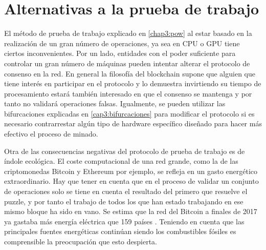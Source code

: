 \section{Alternativas a la prueba de trabajo}
El método de prueba de trabajo explicado en \ref{chap3:pow} al estar basado en la realización de un gran número de operaciones, ya sea en CPU o GPU tiene ciertos inconvenientes. Por un lado, entidades con el poder suficiente para controlar un gran número de máquinas pueden intentar alterar el protocolo de consenso en la red. En general la filosofía del blockchain supone que alguien que tiene interés en participar en el protocolo y lo demuestra invirtiendo su tiempo de procesamiento estará también interesado en que el consenso se mantenga y por tanto no validará operaciones falsas. Igualmente, se pueden utilizar las bifurcaciones explicadas en \ref{cap3:bifurcaciones} para modificar el protocolo si es necesario contrarrestar algún tipo de hardware específico diseñado para hacer más efectivo el proceso de minado.

Otra de las consecuencias negativas del protocolo de prueba de trabajo es de índole ecológica. El coste computacional de una red grande, como la de las criptomonedas Bitcoin y Ethereum por ejemplo, se refleja en un gasto energético extraordinario. Hay que tener en cuenta que en el proceso de validar un conjunto de operaciones solo se tiene en cuenta el resultado del primero que resuelve el puzzle, y por tanto el trabajo de todos los que han estado trabajando en ese mismo bloque ha sido en vano. Se estima que la red del Bitcoin a finales de 2017 ya gastaba más energía eléctrica que 159 países \citep{electricidad}. Teniendo en cuenta que las principales fuentes energéticas continúan siendo los combustibles fósiles es comprensible la preocupación que esto despierta.

